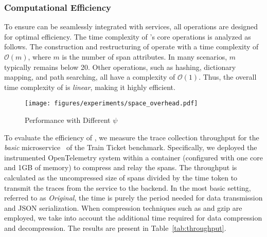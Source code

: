 \subsubsection{Computational Efficiency}

To ensure \alias can be seamlessly integrated with services, all operations are designed for optimal efficiency.
The time complexity of \alias's core operations is analyzed as follows.
The construction and restructuring of \sname operate with a time complexity of $\mathcal{O}(m)$, where $m$ is the number of span attributes.
In many scenarios, $m$ typically remains below 20.
Other operations, such as hashing, dictionary mapping, and path searching, all have a complexity of $\mathcal{O}(1)$.
Thus, the overall time complexity of \alias is \textit{linear}, making it highly efficient.

\begin{figure}
    \centering
    \texttt{[image: figures/experiments/space\_overhead.pdf]}
    \caption{Performance with Different $\psi$}
    \label{fig:space_overhead}
\end{figure}

To evaluate the efficiency of \alias, we measure the trace collection throughput for the \textit{basic} microservice~\cite{trainticket} of the Train Ticket benchmark.
Specifically, we deployed the instrumented OpenTelemetry system within a container (configured with one core and 1GB of memory) to compress and relay the spans.
The throughput is calculated as the uncompressed size of spans divided by the time token to transmit the traces from the service to the backend.
In the most basic setting, referred to as \textit{Original}, the time is purely the period needed for data transmission and JSON serialization.
When compression techniques such as \alias and gzip are employed, we take into account the additional time required for data compression and decompression.
The results are present in Table~\ref{tab:throughput}.

